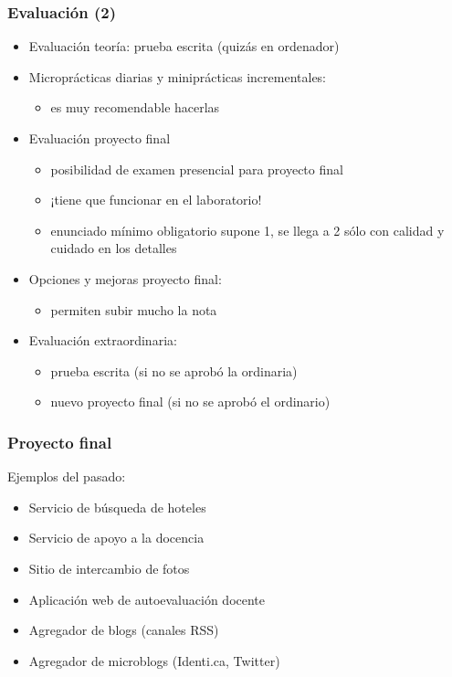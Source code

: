 
\begin{frame}
\frametitle{Evaluación (2)}

\begin{itemize}
\item Evaluación teoría: prueba escrita (quizás en ordenador)
\item Microprácticas diarias y miniprácticas incrementales:
      \begin{itemize}
      \item es muy recomendable hacerlas
      \end{itemize}
\item Evaluación proyecto final
      \begin{itemize}
      \item posibilidad de examen presencial para proyecto final
      \item ¡tiene que funcionar en el laboratorio!
      \item enunciado mínimo obligatorio supone 1, se llega a 2 sólo con calidad y cuidado en los detalles
      \end{itemize}
\item Opciones y mejoras proyecto final:
      \begin{itemize}
      \item permiten subir mucho la nota
      \end{itemize}
\item Evaluación extraordinaria:
  \begin{itemize}
  \item prueba escrita (si no se aprobó la ordinaria)
  \item nuevo proyecto final (si no se aprobó el ordinario)
  \end{itemize}
\end{itemize}
\end{frame}



\begin{frame}
 \frametitle{Proyecto final}

Ejemplos del pasado:

\begin{itemize}
 \item Servicio de búsqueda de hoteles
 \item Servicio de apoyo a la docencia
 \item Sitio de intercambio de fotos
 \item Aplicación web de autoevaluación docente
 \item Agregador de blogs (canales RSS)
 \item Agregador de microblogs (Identi.ca, Twitter)
\end{itemize}

\end{frame}

